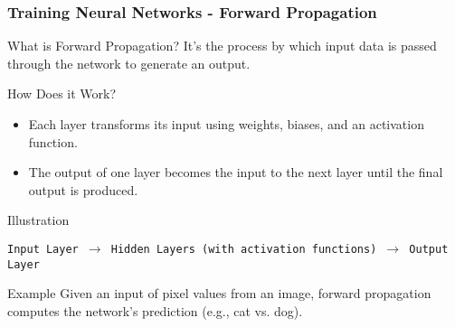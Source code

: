\documentclass[aspectratio=169]{beamer}
\begin{document}
\begin{frame}[fragile]
    \frametitle{Training Neural Networks - Forward Propagation}
    \begin{block}{What is Forward Propagation?}
        It's the process by which input data is passed through the network to generate an output.
    \end{block}

    \begin{block}{How Does it Work?}
        \begin{itemize}
            \item Each layer transforms its input using weights, biases, and an activation function.
            \item The output of one layer becomes the input to the next layer until the final output is produced.
        \end{itemize}
    \end{block}

    \begin{block}{Illustration}
    \begin{center}
    \texttt{Input Layer $\rightarrow$ Hidden Layers (with activation functions) $\rightarrow$ Output Layer}
    \end{center}
    \end{block}

    \begin{block}{Example}
        Given an input of pixel values from an image, forward propagation computes the network's prediction (e.g., cat vs. dog).
    \end{block}
\end{frame}
\end{document}
